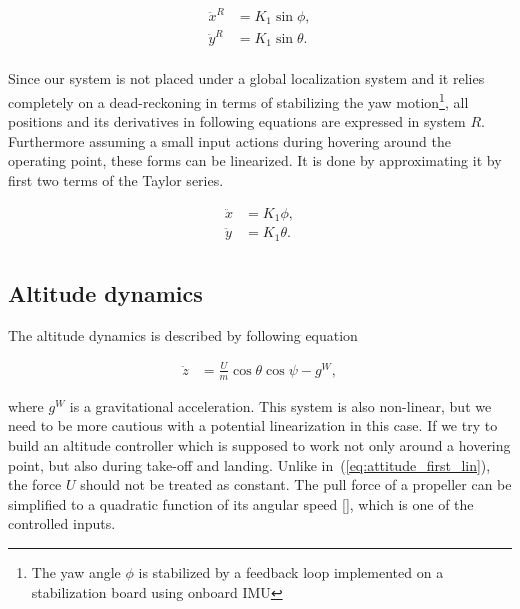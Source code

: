 \begin{equation}
\begin{split}
\ddot{x}^R &= K_1\sin \phi,\\
\ddot{y}^R &= K_1\sin \theta.\\
\end{split}
\label{eq:attitude_first_lin}
\end{equation}

Since our system is not placed under a global localization system and it relies completely on a dead-reckoning in terms of stabilizing the yaw motion\footnote{The yaw angle $\phi$ is stabilized by a feedback loop implemented on a stabilization board using onboard IMU}, all positions and its derivatives in following equations are expressed in system $R$. Furthermore assuming a small input actions during hovering around the operating point, these forms can be linearized. It is done by approximating it by first two terms of the Taylor series.

\begin{equation}
\begin{split}
\ddot{x} &= K_1 \phi,\\
\ddot{y} &= K_1 \theta.\\
\end{split}
\end{equation}

\subsection{Altitude dynamics}

The altitude dynamics is described by following equation

\begin{equation}
\begin{split}
\ddot{z} &= \frac{U}{m}\cos\theta\cos\psi - g^W,
\end{split}
\end{equation}

where $g^W$ is a gravitational acceleration. This system is also non-linear, but we need to be more cautious with a potential linearization in this case. If we try to build an altitude controller which is supposed to work not only around a hovering point, but also during take-off and landing. Unlike in~(\ref{eq:attitude_first_lin}), the force $U$ should not be treated as constant. The pull force of a propeller can be simplified to a quadratic function of its angular speed [], which is one of the controlled inputs.

